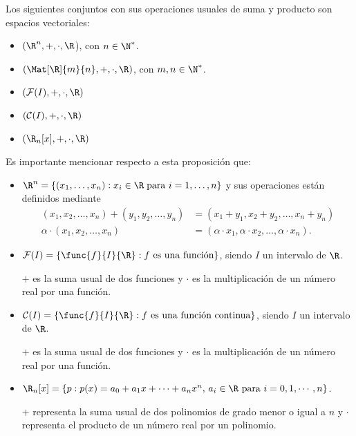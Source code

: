 \documentclass[compacto,10pt]{pubciencias-notas}
\begin{document}
\begin{prop}
    Los siguientes conjuntos con sus operaciones usuales de suma y producto son espacios vectoriales:
    \begin{itemize}
    \item
        $(\R^n, +, \cdot, \R$), con $n\in \N^*$.
        
    \item
        $(\Mat[\R]{m}{n}, +, \cdot, \R)$, con $m,n\in \N^*$.
        
    \item
        $(\mathcal{F}(I), +, \cdot, \R)$
        
    \item
        $(\mathcal{C}(I), +, \cdot, \R)$
    

    
    \item
        $(\R_n[x], +, \cdot, \R)$
    \end{itemize}
\end{prop}

\begin{obs}
Es importante mencionar respecto a esta proposición que:
\begin{itemize}
\item $\R^{n}= \{ (x_{1},\ldots, x_{n}): x_{i} \in \R \; \text{para } i = 1,\ldots, n \}$ y sus operaciones están definidos mediante
\begin{align*}
(x_{1}, x_{2}, \ldots, x_{n})+(y_{1}, y_{2}, \ldots, y_{n}) & = (x_{1}+y_{1}, x_{2}+y_{2}, \ldots, x_{n}+y_{n}) \\
\alpha \cdot (x_{1}, x_{2}, \ldots, x_{n}) & = (\alpha \cdot x_{1}, \alpha \cdot x_{2}, \ldots, \alpha \cdot x_{n}).
\end{align*}
\item $\mathcal{F}(I)=\{\func{f}{I}{\R}: f\text{ es una función}\}$, siendo $I$ un intervalo de $\R$.
            
$+$ es la suma usual de dos funciones y $\cdot$ es la multiplicación de un número real por una función.
\item $\mathcal{C}(I)=\{\func{f}{I}{\R}: f\text{ es una función continua} \}$, siendo $I$ un intervalo de $\R$.
            
$+$ es la suma usual de dos funciones y $\cdot$ es la multiplicación de un número real por una función.
\item $ \R_n[x] = \{ p : p(x) = a_{0} + a_{1}x + \cdots + a_{n}x^{n}, \, a_{i} \in \R \text{ para } i = 0, 1, \cdots, n \}$.
            
$+$ representa la suma usual de dos polinomios de grado menor o igual a $n$ y $\cdot$ representa el producto de un número real por un polinomio.
\end{itemize}
\end{obs}
\end{document}
